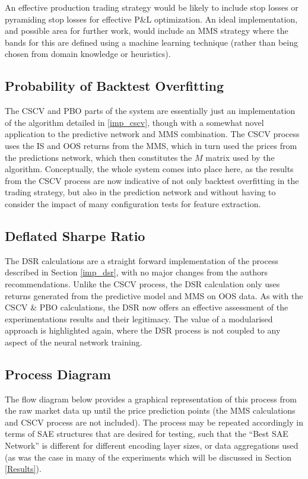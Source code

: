 \documentclass[a4paper,11pt,oneside]{article}
\theoremstyle{plain}
\theoremstyle{definition}
\begin{document}
	An effective production trading strategy would be likely to include stop losses or pyramiding stop losses for effective P\&L optimization. An ideal implementation, and possible area for further work, would include an MMS strategy where the bands for this are defined using a machine learning technique (rather than being chosen from domain knowledge or heuristics).\newline
	
	
	\subsection{Probability of Backtest Overfitting}\label{proc_cscv}
	
	The CSCV and PBO parts of the system are essentially just an implementation of the algorithm detailed in \ref{imp_cscv}, though with a somewhat novel application to the predictive network and MMS combination. The CSCV process uses the IS and OOS returns from the MMS, which in turn used the prices from the predictions network, which then constitutes the $M$ matrix used by the algorithm. Conceptually, the whole system comes into place here, as the results from the CSCV process are now indicative of not only backtest overfitting in the trading strategy, but also in the prediction network and without having to consider the impact of many configuration tests for feature extraction.
	
	\subsection{Deflated Sharpe Ratio}\label{proc_dsr}
	
	The DSR calculations are a straight forward implementation of the process described in Section \ref{imp_dsr}, with no major changes from the authors recommendations. Unlike the CSCV process, the DSR calculation only uses returns generated from the predictive model and MMS on OOS data. As with the CSCV \& PBO calculations, the DSR now offers an effective assessment of the experimentations results and their legitimacy. The value of a modularised approach is highlighted again, where the DSR process is not coupled to any aspect of the neural network training.
	
	\subsection{Process Diagram}\label{proc_diagram}
	
	The flow diagram below provides a graphical representation of this process from the raw market data up until the price prediction points (the MMS calculations and CSCV process are not included). The process may be repeated accordingly in terms of SAE structures that are desired for testing, such that the ``Best SAE Network'' is different for different encoding layer sizes, or data aggregations used (as was the case in many of the experiments which will be discussed in Section \ref{Results}).
	
\end{document}
